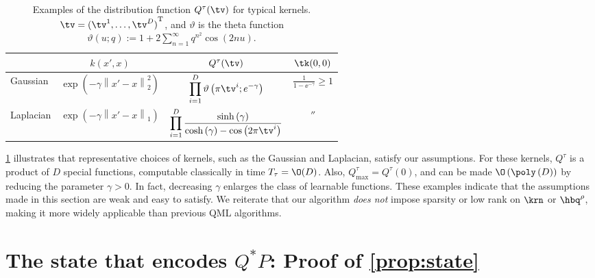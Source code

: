 \begin{table}[htb]
  \begin{center}
  \renewcommand{\arraystretch}{1.7}
  \begin{tabular}{|l|c|c|c|}
  \toprule
  & $k(x',x)$ & $Q^{\tau}(\tv)$ & $\tk(0,0)$ \\
  \midrule
  Gaussian & $\exp\left(-\gamma\left\|x'-x\right\|_2^2\right)$ & $\displaystyle\prod_{i=1}^D\vartheta\left(\pi \tv^i;e^{-\gamma}\right)$ & $\displaystyle\frac{1}{1-\ee^{-\gamma}}\geq 1$\\
  Laplacian & $\exp\left(-\gamma\left\|x'-x\right\|_1\right)$ & $\displaystyle\prod_{i=1}^D\frac{\sinh\left(\gamma\right)}{\cosh\left(\gamma\right)-\cos\left(2\pi \tv^i\right)}$ & $''$\\
  \bottomrule
  \end{tabular}
  \end{center}
  \caption{Examples of the distribution function $Q^{\tau}(\tv)$ for typical kernels. $\tv={(\tv^1,\ldots,\tv^D)}^\mathrm{T}$, and $\vartheta$ is the theta function
  $\vartheta\left(u;q\right):= 1+2\sum_{n=1}^{\infty}q^{n^2}\cos\left(2nu\right)$.}
  \label{table:kernel}
  \end{table}

\begin{remark*}
  \cref{table:kernel} illustrates that representative choices of kernels, such as the Gaussian and Laplacian, satisfy our assumptions. For these kernels, $Q^{\tau}$ is a product of $D$ special functions, computable classically in time $T_\tau=\O(D)$.
  Also, $Q_{\max}^{\tau}=Q^{\tau}\left(0\right)$, and can be made $\O\left(\poly\left(D\right)\right)$ by reducing the parameter $\gamma>0$. In fact, decreasing $\gamma$ enlarges the class of learnable functions.
  These examples indicate that the assumptions made in this section are weak and easy to satisfy.
  We reiterate that our algorithm \textit{does not} impose sparsity or low rank on $\krn$ or $\hbq^{\rho}$,
  making it more widely applicable than previous QML algorithms.
\end{remark*}


\setcounter{equation}{0}
\section{The state that encodes \texorpdfstring{$Q^*P$}{Q\textsuperscript{*}P}: Proof of \texorpdfstring{\cref{prop:state}}{Proposition 5.2}}
\label{app:featureSamp_state}

